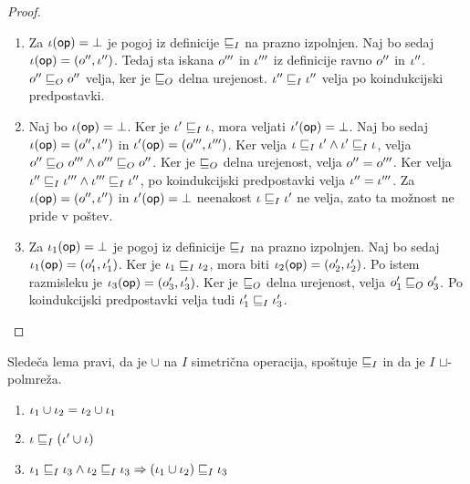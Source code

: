 \begin{proof}
	\begin{enumerate}
		\item Za $\iota(\mathsf{op}) = \bot$ je pogoj iz definicije $\sqsubseteq_{I}$ na prazno izpolnjen.
		Naj bo sedaj $\iota(\mathsf{op}) = (o'',\iota'')$. Tedaj sta iskana $o'''$ in $\iota'''$ iz definicije ravno $o''$ in $\iota''$. $o''\sqsubseteq_{O}o''$ velja, ker je $\sqsubseteq_{O}$ delna urejenost. $\iota'' \sqsubseteq_{I} \iota''$ velja po koindukcijski predpostavki.
		
		\item Naj bo $\iota(\mathsf{op}) = \bot$. Ker je $\iota' \sqsubseteq_{I} \iota$, mora veljati $\iota'(\mathsf{op}) = \bot$.
		Naj bo sedaj $\iota(\mathsf{op}) = (o'', \iota'')$ in $\iota'(\mathsf{op}) = (o''',\iota''')$. Ker velja $\iota \sqsubseteq_{I} \iota' \wedge \iota' \sqsubseteq_{I} \iota$, velja $o'' \sqsubseteq_{O} o''' \wedge o''' \sqsubseteq_{O} o''$. Ker je $\sqsubseteq_{O}$ delna urejenost, velja $o'' = o'''$. Ker velja $\iota'' \sqsubseteq_{I} \iota''' \wedge \iota''' \sqsubseteq_{I} \iota''$, po koindukcijski predpostavki velja $\iota'' = \iota'''$.
		Za $\iota(\mathsf{op}) = (o'', \iota'')$ in $\iota'(\mathsf{op}) = \bot$ neenakost $\iota \sqsubseteq_{I} \iota'$ ne velja, zato ta možnost ne pride v poštev.
		
		\item Za $\iota_1(\mathsf{op}) = \bot$ je pogoj iz definicije $\sqsubseteq_{I}$ na prazno izpolnjen.
		Naj bo sedaj $\iota_1(\mathsf{op}) = (o_1', \iota_1')$. Ker je $\iota_1 \sqsubseteq_{I} \iota_2$, mora biti $\iota_2(\mathsf{op}) = (o_2', \iota_2')$.
		Po istem razmisleku je $\iota_3(\mathsf{op}) = (o_3', \iota_3')$. Ker je $\sqsubseteq_{O}$ delna urejenost, velja $o_1' \sqsubseteq_{O} o_3'$.
		Po koindukcijski predpostavki velja tudi $\iota_1' \sqsubseteq_{I} \iota_3'$.
		
	\end{enumerate}
\end{proof}


Sledeča lema pravi, da je $\cup$ na $I$ simetrična operacija, spoštuje $\sqsubseteq_{I}$ in da je $I$ $\sqcup$-polmreža.

\begin{lema}\label{lem:effects-union}
	\begin{enumerate}
		\item $\iota_1 \cup \iota_2 = \iota_2 \cup \iota_1$
		\item $\iota \sqsubseteq_{I} (\iota' \cup \iota)$
		\item $\iota_1 \sqsubseteq_{I} \iota_3 \wedge \iota_2 \sqsubseteq_{I} \iota_3 \Rightarrow (\iota_1 \cup \iota_2) \sqsubseteq_{I} \iota_3$
	\end{enumerate}

\end{lema}

